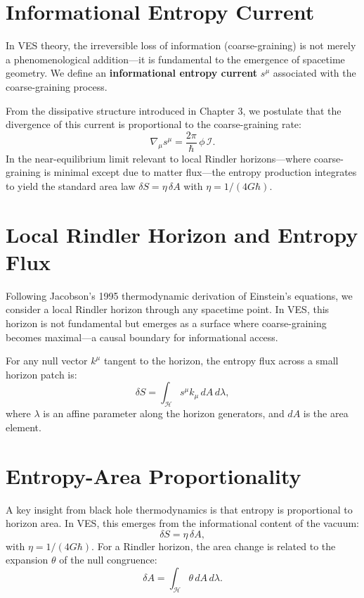 \documentclass[12pt,a4paper]{book}
\newcommand{\I}{\mathcal{I}}
\begin{document}
\section{Informational Entropy Current}

In VES theory, the irreversible loss of information (coarse-graining) is not merely a phenomenological addition—it is fundamental to the emergence of spacetime geometry. We define an \textbf{informational entropy current} $s^\mu$ associated with the coarse-graining process.

From the dissipative structure introduced in Chapter 3, we postulate that the divergence of this current is proportional to the coarse-graining rate:
\begin{equation}
    \nabla_\mu s^\mu = \frac{2\pi}{\hbar} \, \phi \, \I.
\end{equation}
In the near-equilibrium limit relevant to local Rindler horizons—where coarse-graining is minimal except due to matter flux—the entropy production integrates to yield the standard area law $\delta S = \eta \, \delta A$ with $\eta = 1/(4G\hbar)$.

\section{Local Rindler Horizon and Entropy Flux}

Following Jacobson's 1995 thermodynamic derivation of Einstein's equations, we consider a local Rindler horizon through any spacetime point. In VES, this horizon is not fundamental but emerges as a surface where coarse-graining becomes maximal—a causal boundary for informational access.

For any null vector $k^\mu$ tangent to the horizon, the entropy flux across a small horizon patch is:
\begin{equation}
    \delta S = \int_{\mathcal{H}} s^\mu k_\mu \, dA \, d\lambda,
\end{equation}
where $\lambda$ is an affine parameter along the horizon generators, and $dA$ is the area element.

\section{Entropy-Area Proportionality}

A key insight from black hole thermodynamics is that entropy is proportional to horizon area. In VES, this emerges from the informational content of the vacuum:
\begin{equation}
    \delta S = \eta \, \delta A,
\end{equation}
with $\eta = 1/(4G\hbar)$. For a Rindler horizon, the area change is related to the expansion $\theta$ of the null congruence:
\begin{equation}
    \delta A = \int_{\mathcal{H}} \theta \, dA \, d\lambda.
\end{equation}
\end{document}
